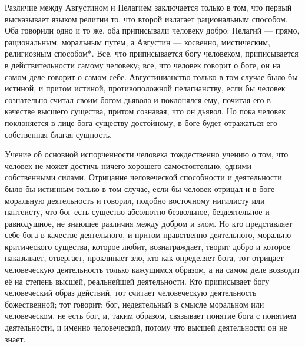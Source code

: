 \documentclass[12pt,oneside]{book}
\begin{document}
Различие между Августином и Пелагием заключается только в том, что первый высказывает языком религии то, что второй излагает рациональным способом. Оба говорили одно и то же, оба приписывали человеку добро: Пелагий --– прямо, рациональным, моральным путем, а Августин --- косвенно, мистическим, религиозным способом*\let\svthefootnote\thefootnote\let\thefootnote\relax{}\let\thefootnote\svthefootnote\dag\let\svthefootnote\thefootnote\let\thefootnote\relax{}\let\thefootnote\svthefootnote. Все, что приписывается богу человеком, приписывается в действительности самому человеку; все, что человек говорит о боге, он на самом деле говорит о самом себе. Августинианство только в том случае было бы истиной, и притом истиной, противоположной пелагианству, если бы человек сознательно считал своим богом дьявола и поклонялся ему, почитая его в качестве высшего существа, притом сознавая, что он дьявол. Но пока человек поклоняется в лице бога существу достойному, в боге будет отражаться его собственная благая сущность.

Учение об основной испорченности человека тождественно учению о том, что человек не может достичь ничего хорошего самостоятельно, одними собственными силами. Отрицание человеческой способности и деятельности было бы истинным только в том случае, если бы человек отрицал и в боге моральную деятельность и говорил, подобно восточному нигилисту или пантеисту, что бог есть существо абсолютно безвольное, бездеятельное и равнодушное, не знающее различия между добром и злом. Но кто представляет себе бога в качестве деятельного, и притом нравственно деятельного, морально критического существа, которое любит, вознаграждает, творит добро и которое наказывает, отвергает, проклинает зло, кто как определяет бога, тот отрицает человеческую деятельность только кажущимся образом, а на самом деле возводит её на степень высшей, реальнейшей деятельности. Кто приписывает богу человеческий образ действий, тот считает человеческую деятельность божественной; тот говорит: бог, недеятельный в смысле моральном или человеческом, не есть бог, и, таким образом, связывает понятие бога с понятием деятельности, и именно человеческой, потому что высшей деятельности он не знает.
\end{document}
